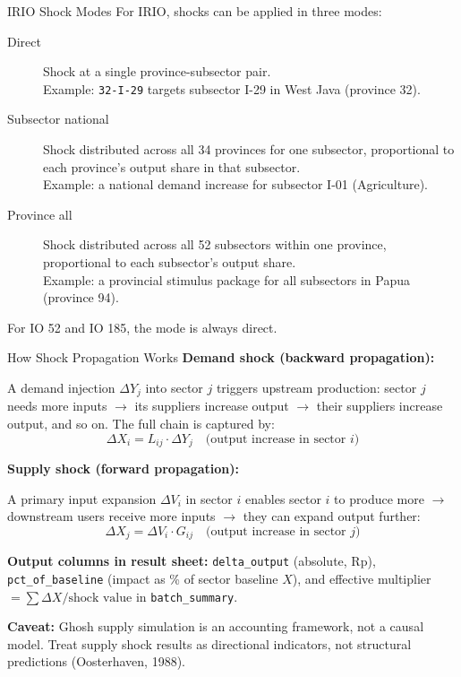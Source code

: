\documentclass[aspectratio=169]{beamer}
\begin{document}
\begin{frame}{IRIO Shock Modes}
For IRIO, shocks can be applied in three modes:

\medskip
\begin{description}
  \item[Direct] Shock at a single province-subsector pair.\\
        Example: \texttt{32-I-29} targets subsector I-29 in West Java (province 32).

  \item[Subsector national] Shock distributed across all 34 provinces for one subsector, proportional to each province's output share in that subsector.\\
        Example: a national demand increase for subsector I-01 (Agriculture).

  \item[Province all] Shock distributed across all 52 subsectors within one province, proportional to each subsector's output share.\\
        Example: a provincial stimulus package for all subsectors in Papua (province 94).
\end{description}

\medskip
For IO 52 and IO 185, the mode is always direct.
\end{frame}

\begin{frame}{How Shock Propagation Works}
\textbf{Demand shock (backward propagation):}

A demand injection $\Delta Y_j$ into sector $j$ triggers upstream production: sector $j$ needs more inputs $\to$ its suppliers increase output $\to$ their suppliers increase output, and so on. The full chain is captured by:
\[
\Delta X_i = L_{ij} \cdot \Delta Y_j \quad \text{(output increase in sector } i \text{)}
\]

\medskip
\textbf{Supply shock (forward propagation):}

A primary input expansion $\Delta V_i$ in sector $i$ enables sector $i$ to produce more $\to$ downstream users receive more inputs $\to$ they can expand output further:
\[
\Delta X_j = \Delta V_i \cdot G_{ij} \quad \text{(output increase in sector } j \text{)}
\]

\medskip
\textbf{Output columns in result sheet:} \texttt{delta\_output} (absolute, Rp), \texttt{pct\_of\_baseline} (impact as \% of sector baseline $X$), and effective multiplier $= \sum \Delta X / \text{shock value}$ in \texttt{batch\_summary}.

\medskip
\small \textbf{Caveat:} Ghosh supply simulation is an accounting framework, not a causal model. Treat supply shock results as directional indicators, not structural predictions (Oosterhaven, 1988).
\end{frame}
\end{document}
